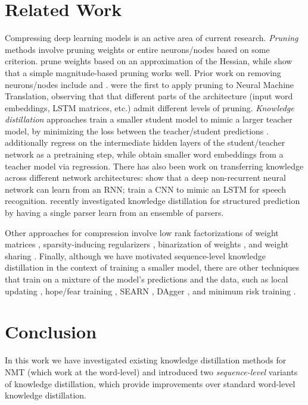\documentclass[11pt,letterpaper]{article}
\begin{document}
\section{Related Work}
Compressing deep learning models is an active area of current research.
\textit{Pruning} methods involve pruning weights or entire neurons/nodes based on
some criterion.  prune weights
based on an approximation of the Hessian, while  show that a simple
magnitude-based pruning works well. Prior work on removing neurons/nodes include  
and .  were the first to apply pruning  
 to Neural Machine Translation,
observing that that different parts of the architecture 
(input word embeddings, LSTM matrices, etc.) admit different
levels of pruning.
\textit{Knowledge distillation} approaches train a smaller student model to mimic a larger teacher model, by minimizing 
the loss between the teacher/student predictions \cite{Bucila2006,Ba2014,Li2014,Hinton2015}.
 additionally regress on the intermediate hidden layers of the student/teacher
network as a pretraining step, while  obtain smaller word embeddings from a teacher model via regression.
There has also been work on transferring knowledge across different network 
architectures:   show that a 
deep non-recurrent neural network can learn from an RNN; 
train a CNN to mimic an LSTM for speech recognition.  recently investigated
knowledge distillation for structured prediction by having a single parser learn
from an ensemble of parsers.

Other approaches for compression involve low rank factorizations of weight matrices \cite{Denton2014,Jaderberg2014,Lu2016,Prabhavalkar2016},
sparsity-inducing regularizers \cite{Murray2015}, binarization of weights \cite{Courbariaux2016,Lin2016},
and weight sharing \cite{Chen2015b,Han2016}. 
Finally, although we have motivated sequence-level knowledge distillation in the context of training a smaller model,
there are other techniques that train on a mixture of the model's predictions and the data, such as 
local updating \cite{Liang2006}, hope/fear training \cite{Chiang2012}, SEARN \cite{Daume2009},
DAgger \cite{Ross2011}, and minimum risk training \cite{Och2003,Shen2016}.

\section{Conclusion}
In this work we have investigated existing knowledge distillation methods for NMT (which work at the
word-level) and
introduced two \textit{sequence-level} variants of knowledge distillation, which provide
improvements over standard word-level knowledge distillation.
\end{document}

